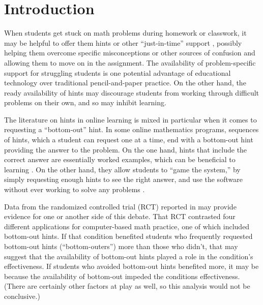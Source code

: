 \documentclass[]{article}
\begin{document}
\clearpage

\section{Introduction}

When students get stuck on math problems during homework or classwork, it may be helpful to offer them hints or other ``just-in-time'' support \cite[e.g][]{jit}, possibly helping them overcome specific misconceptions or other sources of confusion and allowing them to move on in the assignment.
The availability of problem-specific support for struggling students is one potential advantage of educational technology over traditional pencil-and-paper practice.
On the other hand, the ready availability of hints may discourage students from working through difficult problems on their own, and so may inhibit learning.

The literature on hints in online learning is mixed \citep[see, e.g.,][]{aleven2016help,goldin2012learner,sales2021student} in particular when it comes to requesting a ``bottom-out'' hint. In some online mathematics programs, sequences of hints, which a student can request one at a time, end with a bottom-out hint providing the answer to the problem. On the one hand, hints that include the correct answer are essentially worked examples, which can be beneficial to learning \citep[e.g.]{sweller1985use}. On the other hand, they allow students to ``game the system,'' by simply requesting enough hints to see the right answer, and use the software without ever working to solve any problems \citep[e.g.][]{guo2008trying}.

Data from the randomized controlled trial (RCT) reported in \citet{impactPaper} may provide evidence for one or another side of this debate.
That RCT contrasted four different applications for computer-based math practice, one of which included bottom-out hints.
If that condition benefited students who frequently requested bottom-out hints (``bottom-outers'') more than those who didn't, that may suggest that the availability of bottom-out hints played a role in the condition's effectiveness.
If students who avoided bottom-out hints benefited more, it may be because the availability of bottom-out impeded the conditions effectiveness.
(There are certainly other factors at play as well, so this analysis would not be conclusive.)
\end{document}
